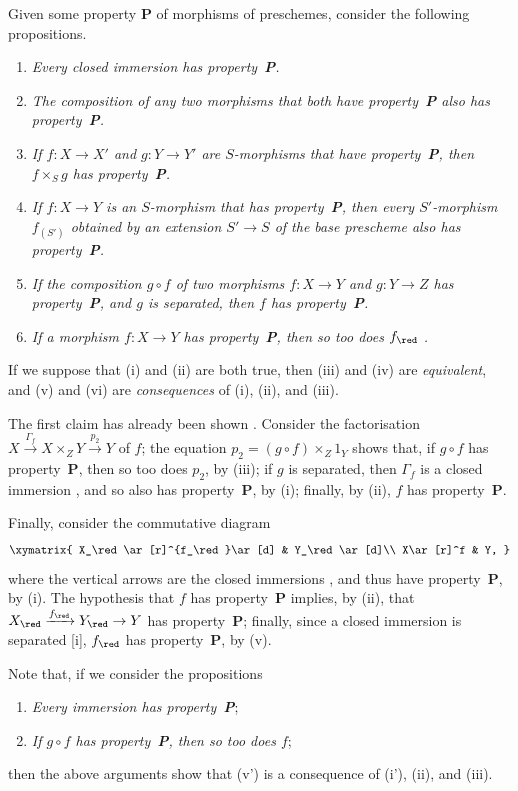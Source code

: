 \begin{remark}[5.5.12]
\label{I.5.5.12}
Given some property \textbf{P} of morphisms of preschemes, consider the following propositions.
\begin{enumerate}
  \item[(i)] \emph{Every closed immersion has property~\textbf{P}.}
  \item[(ii)] \emph{The composition of any two morphisms that both have property~\textbf{P} also has property~\textbf{P}.}
  \item[(iii)] \emph{If $f:X\to X'$ and $g:Y\to Y'$ are $S$-morphisms that have property~\textbf{P}, then $f\times_S g$ has property~\textbf{P}.}
  \item[(iv)] \emph{If $f:X\to Y$ is an $S$-morphism that has property~\textbf{P}, then every $S'$-morphism $f_{(S')}$ obtained by an extension $S'\to S$ of the base prescheme also has property~\textbf{P}.}
  \item[(v)] \emph{If the composition $g\circ f$ of two morphisms $f:X\to Y$ and $g:Y\to Z$ has property~\textbf{P}, and $g$ is separated, then $f$ has property~\textbf{P}.}
  \item[(vi)] \emph{If a morphism $f:X\to Y$ has property~\textbf{P}, then so too does $f_\red$ .}
\end{enumerate}
If we suppose that (i) and (ii) are both true, then (iii) and (iv) are \emph{equivalent}, and (v) and (vi) are \emph{consequences} of (i), (ii), and (iii).

The first claim has already been shown .
Consider the factorisation  $X\xrightarrow{\Gamma_f}X\times_Z Y\xrightarrow{p_2}Y$ of $f$;
the equation $p_2=(g\circ f)\times_Z 1_Y$ shows that, if $g\circ f$ has property~\textbf{P}, then so too does $p_2$, by (iii);
if $g$ is separated, then $\Gamma_f$ is a closed immersion , and so also has property~\textbf{P}, by (i);
finally, by (ii), $f$ has property~\textbf{P}.

Finally, consider the commutative diagram
\[
  \xymatrix{
    X_\red\ar[r]^{f_\red}\ar[d] &
    Y_\red\ar[d]\\
    X\ar[r]^f &
    Y,
  }
\]
where the vertical arrows are the closed immersions , and thus have property~\textbf{P}, by (i).
The hypothesis that $f$ has property~\textbf{P} implies, by (ii), that $X_\red\xrightarrow{f_\red}Y_\red\to Y$ has property~\textbf{P};
finally, since a closed immersion is separated [i], $f_\red$ has property~\textbf{P}, by (v).

Note that, if we consider the propositions
\begin{enumerate}
  \item[(i')] \emph{Every immersion has property~\textbf{P}};
  \item[(v')] \emph{If $g\circ f$ has property~\textbf{P}, then so too does $f$};
\end{enumerate}
then the above arguments show that (v') is a consequence of (i'), (ii), and (iii).
\end{remark}

